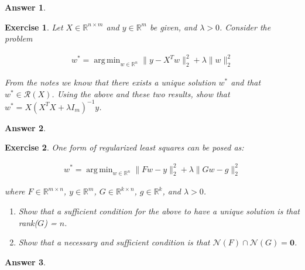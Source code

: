 \documentclass[12pt]{article}
\DeclareMathOperator*{\argmin}{arg\,min}
\theoremstyle{colon}
\newtheorem{exercise}{Exercise}
\newtheorem*{answer}{Answer}
\begin{document}
\begin{answer}
  
\end{answer}

\clearpage

\begin{exercise}
  Let $X \in \mathbb{R}^{n \times m}$ and $y \in \mathbb{R}^{m}$ be given, and $\lambda > 0$. Consider the problem

  \begin{gather*}
    w^* = \argmin_{w \in \mathbb{R}^n} \lVert y - X^T w \rVert_2^2 + \lambda \lVert w \rVert_2^2
  \end{gather*}

  From the notes we know that there exists a unique solution $w^*$ and that $w^* \in \mathcal{R}(X)$. Using the above and these two results, show that $w^* = X (X^TX + \lambda I_m)^{-1} y$.
\end{exercise}

\begin{answer}
  
\end{answer}

\clearpage

\begin{exercise}
  One form of regularized least squares can be posed as:

  \begin{gather*}
    w^* = \argmin_{w \in \mathbb{R}^n} \lVert F w - y \rVert_2^2 + \lambda \lVert G w - g \rVert_2^2
  \end{gather*}

  where $F \in \mathbb{R}^{m \times n}$, $y \in \mathbb{R}^m$, $G \in \mathbb{R}^{k \times n}$, $g \in \mathbb{R}^k$, and $\lambda > 0$.

  \begin{enumerate}[label=\alph*)]
    \item Show that a sufficient condition for the above to have a unique solution is that rank($G$) = $n$.
    \item Show that a necessary and sufficient condition is that $\mathcal{N}(F) \cap \mathcal{N}(G) = \mathbf{0}$.
  \end{enumerate}
\end{exercise}

\begin{answer}
  
\end{answer}
\end{document}
